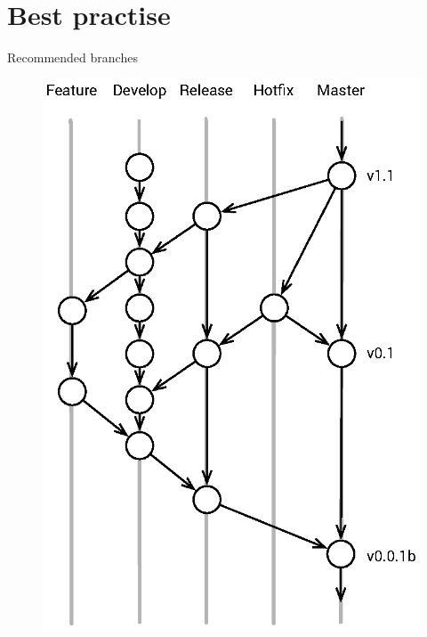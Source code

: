 \documentclass{beamer}
\begin{document}
\section{Best practise}
\begin{frame}{Recommended branches}
    \begin{figure}
        \center
        \includegraphics[height=.8\textheight]{git-recommended-branches}
        \label{fig:git-recommanded-branches}
    \end{figure}
\end{frame}
\end{document}
